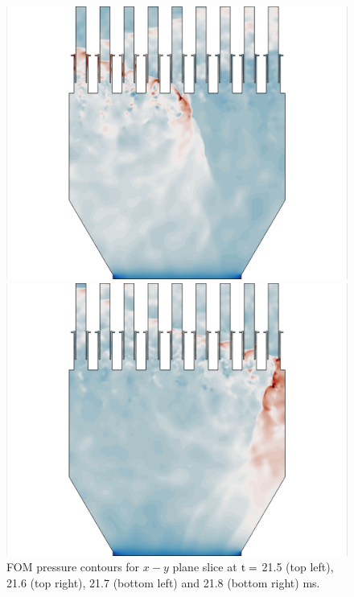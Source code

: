 \begin{figure}
	\begin{minipage}{0.49\linewidth}
		\includegraphics[width=0.99\linewidth,trim={0.5em 0em 6cm 0em},clip]{Chapters/HPROMResults/Images/nineElem/example_snaps/example_pressure_z_217000.png}
	\end{minipage}
	\begin{minipage}{0.49\linewidth}
		\includegraphics[width=0.99\linewidth,trim={6cm 0em 0.5em 0em},clip]{Chapters/HPROMResults/Images/nineElem/example_snaps/example_pressure_z_218000.png}
	\end{minipage}
	\caption{\label{fig:nineElemFOMPressure}FOM pressure contours for $x-y$ plane slice at $\text{t} = $ 21.5 (top left), 21.6 (top right), 21.7 (bottom left) and 21.8 (bottom right) ms.}
\end{figure}


